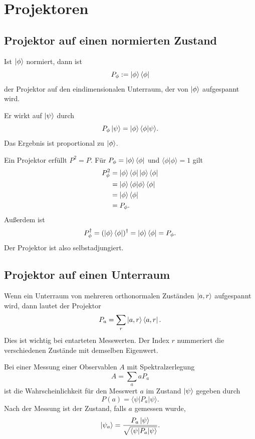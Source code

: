 \section{Projektoren}

\subsection{Projektor auf einen normierten Zustand}

\begin{definitionbox}
Ist $\left|\phi\right\rangle$ normiert, dann ist
\[
    P_\phi:=\left|\phi\right\rangle\left\langle\phi\right|
\]
der Projektor auf den eindimensionalen Unterraum, der von $\left|\phi\right\rangle$ aufgespannt wird.
\end{definitionbox}

Er wirkt auf $\left|\psi\right\rangle$ durch
\[
    P_\phi\left|\psi\right\rangle=\left|\phi\right\rangle\langle\phi|\psi\rangle.
\]
Das Ergebnis ist proportional zu $\left|\phi\right\rangle$.

\begin{derivationbox}
Ein Projektor erfüllt $P^2=P$. Für $P_\phi=\left|\phi\right\rangle\left\langle\phi\right|$ und $\langle\phi|\phi\rangle=1$ gilt
\[
\begin{aligned}
    P_\phi^2
    &=\left|\phi\right\rangle\left\langle\phi\right|\left|\phi\right\rangle\left\langle\phi\right| \\
    &=\left|\phi\right\rangle\langle\phi|\phi\rangle\left\langle\phi\right| \\
    &=\left|\phi\right\rangle\left\langle\phi\right| \\
    &=P_\phi.
\end{aligned}
\]
Außerdem ist
\[
    P_\phi^\dagger=(\left|\phi\right\rangle\left\langle\phi\right|)^\dagger=\left|\phi\right\rangle\left\langle\phi\right|=P_\phi.
\]
Der Projektor ist also selbstadjungiert.
\end{derivationbox}

\subsection{Projektor auf einen Unterraum}

Wenn ein Unterraum von mehreren orthonormalen Zuständen $\left|a,r\right\rangle$ aufgespannt wird, dann lautet der Projektor
\[
    P_a=\sum_r \left|a,r\right\rangle\left\langle a,r\right|.
\]
Dies ist wichtig bei entarteten Messwerten. Der Index $r$ nummeriert die verschiedenen Zustände mit demselben Eigenwert.

\begin{conceptbox}
Bei einer Messung einer Observablen $A$ mit Spektralzerlegung
\[
    A=\sum_a aP_a
\]
ist die Wahrscheinlichkeit für den Messwert $a$ im Zustand $\left|\psi\right\rangle$ gegeben durch
\[
    P(a)=\langle\psi|P_a|\psi\rangle.
\]
Nach der Messung ist der Zustand, falls $a$ gemessen wurde,
\[
    \left|\psi_a\right\rangle=\frac{P_a\left|\psi\right\rangle}{\sqrt{\langle\psi|P_a|\psi\rangle}}.
\]
\end{conceptbox}

